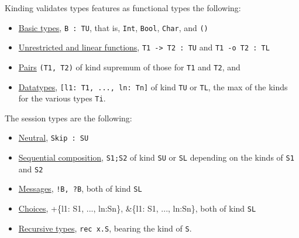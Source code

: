 \documentclass[10pt]{beamer}
\begin{document}
\begin{frame}{Kinding validates types}
\freest{} features as functional types the following:
\begin{itemize}
\item \underline{Basic types}, \lstinline|B : TU|, that is, \lstinline|Int|,
  \lstinline|Bool|, \lstinline|Char|, and \lstinline|()|
\item \underline{Unrestricted and linear functions}, \lstinline|T1 -> T2 : TU| and
  \lstinline|T1 -o T2 : TL|
\item \underline{Pairs} \lstinline|(T1, T2)| of kind
  supremum of those for
  \lstinline|T1| and \lstinline|T2|, and
\item \underline{Datatypes}, \lstinline|[l1: T1, ..., ln: Tn]| of kind
  \lstinline|TU| or \lstinline|TL|, the max of the kinds for the
  various types \lstinline|Ti|.
\end{itemize}
\pause

The session types are the following:
\begin{itemize}
\item \underline{Neutral}, \lstinline|Skip : SU|
\item \underline{Sequential composition}, \lstinline|S1;S2| of kind \lstinline|SU|
  or \lstinline|SL| depending on the kinds of \lstinline|S1| and
  \lstinline|S2|
\item  \underline{Messages}, \lstinline|!B, ?B|, both of kind \lstinline|SL|
\item \underline{Choices}, +\{l1: S1, ..., ln:Sn\}, \&\{l1: S1, ..., ln:Sn\},
  both of kind \lstinline|SL|
\item \underline{Recursive types}, \lstinline|rec x.S|, bearing the kind of
  \lstinline|S|.
\end{itemize}
	
\end{frame}
\end{document}
